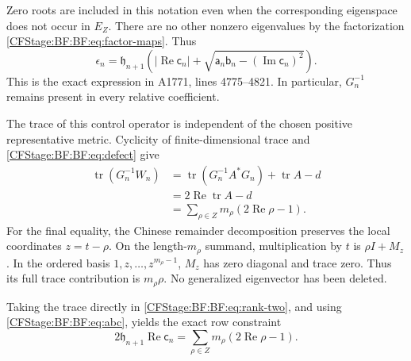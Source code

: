 Zero roots are included in this notation even when the corresponding
eigenspace does not occur in \(E_Z\).
There are no other nonzero eigenvalues by the factorization
\eqref{CFStage:BF:BF:eq:factor-maps}.  Thus
\begin{equation}
\epsilon_n=\mathfrak h_{n+1}
\left(
 |\operatorname{Re}\mathsf c_n|
 +\sqrt{\mathsf a_n\mathsf b_n-
                  (\operatorname{Im}\mathsf c_n)^2}
\right).
\tag{BF.22}\label{CFStage:BF:BF:eq:explicit-excess}
\end{equation}
This is the exact expression in A1771, lines 4775--4821.
In particular, \(G_n^{-1}\) remains present in every relative
coefficient.

The trace of this control operator is independent of the chosen
positive representative metric.  Cyclicity of finite-dimensional
trace and \eqref{CFStage:BF:BF:eq:defect} give
\begin{equation}
\begin{split}
\operatorname{tr}(G_n^{-1}W_n)
&=\operatorname{tr}(G_n^{-1}A^*G_n)
  +\operatorname{tr}A-d\\
&=2\operatorname{Re}\operatorname{tr}A-d\\
&=\sum_{\rho\in Z}m_\rho(2\operatorname{Re}\rho-1).
\end{split}
\tag{BF.23}\label{CFStage:BF:BF:eq:trace-invariant}
\end{equation}
For the final equality, the Chinese remainder decomposition preserves
the local coordinates \(z=t-\rho\).  On the length-\(m_\rho\)
summand, multiplication by \(t\) is \(\rho I+M_z\).  In the ordered
basis \(1,z,\ldots,z^{m_\rho-1}\), \(M_z\) has zero diagonal and
trace zero.  Thus its full trace contribution is \(m_\rho\rho\).
No generalized eigenvector has been deleted.

Taking the trace directly in \eqref{CFStage:BF:BF:eq:rank-two}, and using
\eqref{CFStage:BF:BF:eq:abc}, yields the exact row constraint
\begin{equation}
\boxed{\;
2\mathfrak h_{n+1}\operatorname{Re}\mathsf c_n
 =\sum_{\rho\in Z}m_\rho(2\operatorname{Re}\rho-1).
\;}
\tag{BF.24}\label{CFStage:BF:BF:eq:row-trace}
\end{equation}

